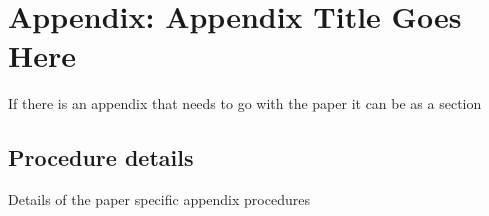 \section{Appendix: Appendix Title Goes Here}
If there is an appendix that needs to go with the paper it can be as a section \autocite{virkContractibilityRipsComplexes2024}

\subsection{Procedure details}
Details of the paper specific appendix procedures